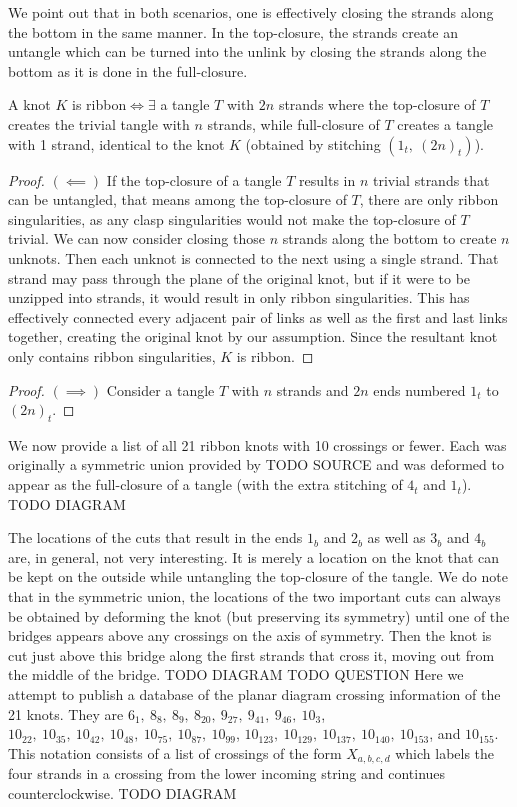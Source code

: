 \begin{paper}
We point out that in both scenarios, one is effectively closing the strands
along the bottom in the same manner.
In the top-closure, the strands create an untangle which can be turned into the
unlink by closing the strands along the bottom as it is done in the
full-closure.

\begin{theorem}
A knot $K$ is ribbon$\iff\exists$ a tangle $T$ with $2n$ strands where the
top-closure of $T$ creates the trivial tangle with $n$ strands, while
full-closure of $T$ creates a tangle with 1 strand, identical to the knot $K$
(obtained by stitching $(1_t,~(2n)_t)$).
\end{theorem}
\begin{proof}
$(\impliedby)$
If the top-closure of a tangle $T$ results in $n$ trivial strands that can be
untangled, that means among the top-closure of $T$, there are only ribbon
singularities, as any clasp singularities would not make the top-closure of $T$
trivial.
We can now consider closing those $n$ strands along the bottom to create $n$
unknots.
Then each unknot is connected to the next using a single strand.
That strand may pass through the plane of the original knot, but if it were to
be unzipped into strands, it would result in only ribbon singularities.
This has effectively connected every adjacent pair of links as well as the first
and last links together, creating the original knot by our assumption.
Since the resultant knot only contains ribbon singularities, $K$ is ribbon.
\end{proof}
\begin{proof}
$(\implies)$
Consider a tangle $T$ with $n$ strands and $2n$ ends numbered $1_t$ to $(2n)_t$.

\end{proof}
We now provide a list of all 21 ribbon knots with 10 crossings or fewer.
Each was originally a symmetric union provided by TODO SOURCE and was deformed
to appear as the full-closure of a tangle (with the extra stitching of $4_t$ and
$1_t$).
TODO DIAGRAM

The locations of the cuts that result in the ends $1_b$ and $2_b$ as well as
$3_b$ and $4_b$ are, in general, not very interesting.
It is merely a location on the knot that can be kept on the outside while
untangling the top-closure of the tangle.
We do note that in the symmetric union, the locations of the two important cuts
can always be obtained by deforming the knot (but preserving its symmetry) until
one of the bridges appears above any crossings on the axis of symmetry.
Then the knot is cut just above this bridge along the first strands that cross
it, moving out from the middle of the bridge.
TODO DIAGRAM
TODO QUESTION
Here we attempt to publish a database of the planar diagram crossing information
of the 21 knots.
They are $6_1,~8_8,~8_9,~8_{20},~9_{27},~9_{41},~9_{46},~10_3$,
$10_{22},~10_{35},~10_{42},~10_{48},~10_{75},~10_{87},~10_{99}$,
$10_{123},~10_{129},~10_{137},~10_{140},~10_{153}$, and $10_{155}$.
This notation consists of a list of crossings of the form $X_{a,b,c,d}$ which
labels the four strands in a crossing from the lower incoming string and
continues counterclockwise.
TODO DIAGRAM


\end{paper}

